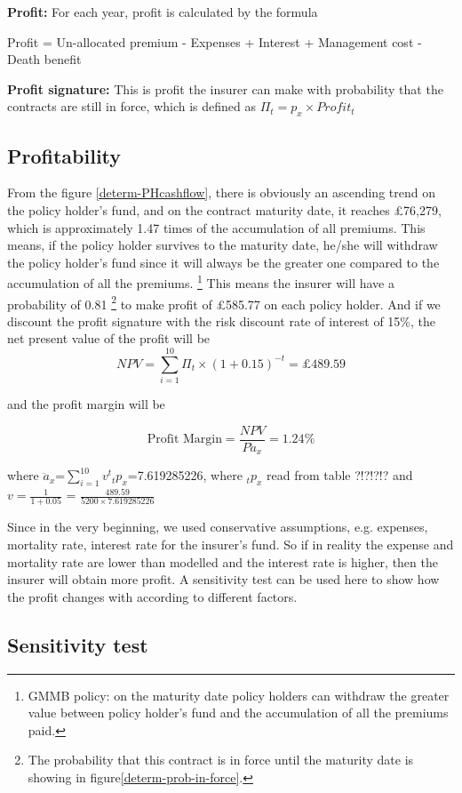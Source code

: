 \documentclass{report}
\begin{document}
\textbf{Profit:} For each year, profit is calculated by the formula

Profit = Un-allocated premium - Expenses + Interest + Management cost - Death benefit

\textbf{Profit signature:} This is profit the insurer can make with probability that the contracts are still in force, which is defined as $\Pi_t = p_x \times Profit_t$


\subsection{Profitability}


From the figure \ref{determ-PHcashflow}, there is obviously an ascending trend on the policy holder's fund, and on the contract maturity date, it reaches \pounds 76,279, which is approximately 1.47 times of the accumulation of all premiums. This means, if the policy holder survives to the maturity date, he/she will withdraw the policy holder's fund since it will always be the greater one compared to the accumulation of all the premiums. \footnote{GMMB policy: on the maturity date policy holders can withdraw the greater value between policy holder's fund and the accumulation of all the premiums paid.} This means the insurer will have a probability of 0.81 \footnote{The probability that this contract is in force until the maturity date is showing in figure\ref{determ-prob-in-force}.} to make profit of \pounds 585.77 on each policy holder. And if we discount the profit signature with the risk discount rate of interest of 15\%, the net present value of the profit will be 
\[
 NPV=\sum_{i=1}^{10} \Pi_t \times (1+0.15)^{-t} = \pounds 489.59
\]
 
and the profit margin will be


\[
\text{Profit\ Margin} =  \frac{NPV}{P \ddot{a}_x} = 1.24\%
\]

where $\ddot{a}_x$=$\sum_{i=1}^{10} v^t {_tp_x}$=7.619285226, where $_tp_x$
read from table ?!?!?!? and $v=\frac{1}{1+0.05}$  = $\frac{489.59}{5200 \times
7.619285226}$

Since in the very beginning, we used conservative assumptions, e.g. expenses, mortality rate, interest rate for the insurer's fund. So if in reality the expense and mortality rate are lower than modelled and the interest rate is higher, then the insurer will obtain more profit. A sensitivity test can be used here to show how the profit changes with according to different factors. 

\subsection{Sensitivity test}
\end{document}
